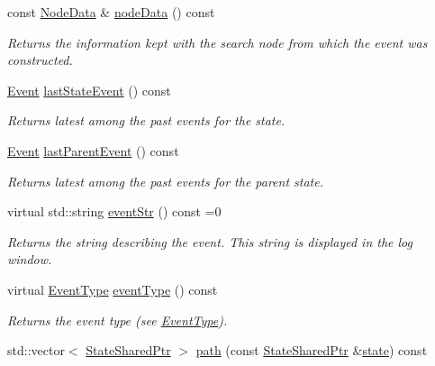 \begin{DoxyCompactItemize}
const \hyperlink{structslb_1_1core_1_1ui_1_1EventBase_a1eefdf6331e2af79cd1ba37eff880a18}{Node\+Data} \& \hyperlink{structslb_1_1core_1_1ui_1_1EventBase_a6ea3aa8fc149f08ff986076852d7802b}{node\+Data} () const 
\begin{DoxyCompactList}\small\item\em Returns the information kept with the search node from which the event was constructed. \end{DoxyCompactList}\item 
\hyperlink{structslb_1_1core_1_1ui_1_1EventBase_a7b61ed0ba0f2fdeb854c631188725d37}{Event} \hyperlink{structslb_1_1core_1_1ui_1_1EventBase_af3b3faf8b00ae20b921bd12a21e865d1}{last\+State\+Event} () const 
\begin{DoxyCompactList}\small\item\em Returns latest among the past events for the state. \end{DoxyCompactList}\item 
\hyperlink{structslb_1_1core_1_1ui_1_1EventBase_a7b61ed0ba0f2fdeb854c631188725d37}{Event} \hyperlink{structslb_1_1core_1_1ui_1_1EventBase_a5cc22688f532de0e32a50bbe3188f17a}{last\+Parent\+Event} () const 
\begin{DoxyCompactList}\small\item\em Returns latest among the past events for the parent state. \end{DoxyCompactList}\item 
virtual std\+::string \hyperlink{structslb_1_1core_1_1ui_1_1EventBase_a048e92286f3ee57db7e9447b5bd192ba}{event\+Str} () const =0
\begin{DoxyCompactList}\small\item\em Returns the string describing the event. This string is displayed in the log window. \end{DoxyCompactList}\item 
virtual \hyperlink{namespaceslb_1_1core_1_1ui_ae44f7078122b3f63928fd619fadd2dcd}{Event\+Type} \hyperlink{structslb_1_1core_1_1ui_1_1EventBase_ac9767dc972acabf2c250fd4dd30a5081}{event\+Type} () const 
\begin{DoxyCompactList}\small\item\em Returns the event type (see \hyperlink{namespaceslb_1_1core_1_1ui_ae44f7078122b3f63928fd619fadd2dcd}{Event\+Type}). \end{DoxyCompactList}\item 
std\+::vector$<$ \hyperlink{structslb_1_1core_1_1ui_1_1EventBase_a50419d00607aad434bb97138eabe2c94}{State\+Shared\+Ptr} $>$ \hyperlink{structslb_1_1core_1_1ui_1_1EventBase_ae324be109b4869e5c3e85f950ef83ff1}{path} (const \hyperlink{structslb_1_1core_1_1ui_1_1EventBase_a50419d00607aad434bb97138eabe2c94}{State\+Shared\+Ptr} \&\hyperlink{structslb_1_1core_1_1ui_1_1EventBase_a1890daf7f5d663402d2272ba5f41f4d7}{state}) const 

\end{DoxyCompactItemize}
